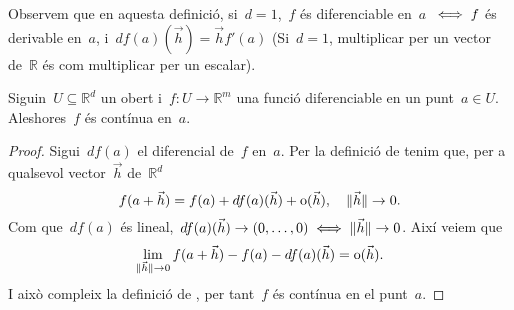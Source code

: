 \documentclass[../../Main.tex]{subfiles}
\begin{document}
	\begin{observation}
		\label{obs:diferencial en d=1 és com derivar}
		Observem que en aquesta definició, si~\(d=1\),~\(f\) és diferenciable en~\(a\)~\(\iff f\) és derivable en~\(a\), i~\(df(a)(\vec{h})=\vec{h}f'(a)\) (Si~\(d=1\), multiplicar per un vector de~\(\mathbb{R}\) és com multiplicar per un escalar).
	\end{observation}
	\begin{proposition}
		\label{prop:Diferenciable implica contínua}
		Siguin~\(U\subseteq\mathbb{R}^{d}\) un obert i~\(f\colon U\to\mathbb{R}^{m}\) una funció diferenciable en un punt~\(a\in U\).
		Aleshores~\(f\) és contínua en~\(a\).
		\begin{proof}
			Sigui~\(df(a)\) el diferencial de~\(f\) en~\(a\).
			Per la definició de  tenim que, per a qualsevol vector~\(\vec{h}\) de~\(\mathbb{R}^d\)
			\[
			    f(a+\vec{h})=f(a)+df(a)(\vec{h})+\operatorname{o}(\vec{h}),\quad \lVert\vec{h}\rVert\to0.
			\]
			Com que~\(df(a)\) és lineal,~\(df(a)(\vec{h})\to(0,\dots,0)\iff\lVert\vec{h}\rVert\to0\).
			Així veiem que
			\[
			    \lim_{\lVert\vec{h}\rVert\to0}f(a+\vec{h})-f(a)-df(a)(\vec{h})=\operatorname{o}(\vec{h}).
			\]
			I això compleix la definició de , per tant~\(f\) és contínua en el punt~\(a\).
		\end{proof}
	\end{proposition}
\end{document}
